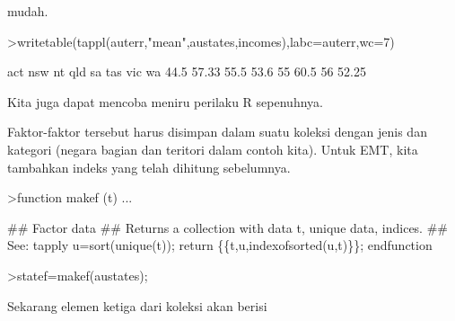 \documentclass[a4paper,10pt]{article}
\begin{document}
\begin{eulernotebook}
\begin{eulercomment}
\begin{eulercomment}
\begin{eulercomment}
\begin{eulercomment}
\begin{eulercomment}
\begin{eulercomment}
\begin{eulercomment}
\begin{eulercomment}
\begin{eulercomment}
\begin{eulercomment}
\begin{eulercomment}
\begin{eulercomment}
\begin{eulercomment}
\begin{eulercomment}
\begin{eulercomment}
\begin{eulercomment}
\begin{eulercomment}
\begin{eulercomment}
\begin{eulercomment}
\begin{eulercomment}
\begin{eulercomment}
\begin{eulercomment}
\begin{eulercomment}
\begin{eulercomment}
\begin{eulercomment}
\begin{eulercomment}
\begin{eulercomment}
\begin{eulercomment}
\begin{eulercomment}
\begin{eulercomment}
\begin{eulercomment}
\begin{eulercomment}
\begin{eulercomment}
\begin{eulercomment}
\begin{eulercomment}
\begin{eulercomment}
\begin{eulercomment}
\begin{eulercomment}
\begin{eulercomment}
\begin{eulercomment}
\begin{eulercomment}
\begin{eulercomment}
\begin{eulercomment}
\begin{eulercomment}
\begin{eulercomment}
\begin{eulercomment}
\begin{eulercomment}
\begin{eulercomment}
\begin{eulercomment}
\begin{eulercomment}
\begin{eulercomment}
\begin{eulercomment}
\begin{eulercomment}
\begin{eulercomment}
\begin{eulercomment}
\begin{eulercomment}
\begin{eulercomment}
\begin{eulercomment}
\begin{eulercomment}
\begin{eulercomment}
\begin{eulercomment}
\begin{eulercomment}
\begin{eulercomment}
\begin{eulercomment}
\begin{eulercomment}
\begin{eulercomment}
\begin{eulercomment}
\begin{eulercomment}
\begin{eulercomment}
mudah.
\end{eulercomment}
\begin{eulerprompt}
>writetable(tappl(auterr,"mean",austates,incomes),labc=auterr,wc=7)
\end{eulerprompt}
\begin{euleroutput}
      act    nsw     nt    qld     sa    tas    vic     wa
     44.5  57.33   55.5   53.6     55   60.5     56  52.25
\end{euleroutput}
\begin{eulercomment}
Kita juga dapat mencoba meniru perilaku R sepenuhnya.

Faktor-faktor tersebut harus disimpan dalam suatu koleksi dengan jenis
dan kategori (negara bagian dan teritori dalam contoh kita). Untuk
EMT, kita tambahkan indeks yang telah dihitung sebelumnya.
\end{eulercomment}
\begin{eulerprompt}
>function makef (t) ...
\end{eulerprompt}
\begin{eulerudf}
  ## Factor data
  ## Returns a collection with data t, unique data, indices.
  ## See: tapply
  u=sort(unique(t));
  return \{\{t,u,indexofsorted(u,t)\}\};
  endfunction
\end{eulerudf}
\begin{eulerprompt}
>statef=makef(austates);
\end{eulerprompt}
\begin{eulercomment}
Sekarang elemen ketiga dari koleksi akan berisi 
\end{eulercomment}
\end{eulercomment}
\end{eulercomment}
\end{eulercomment}
\end{eulercomment}
\end{eulercomment}
\end{eulercomment}
\end{eulercomment}
\end{eulercomment}
\end{eulercomment}
\end{eulercomment}
\end{eulercomment}
\end{eulercomment}
\end{eulercomment}
\end{eulercomment}
\end{eulercomment}
\end{eulercomment}
\end{eulercomment}
\end{eulercomment}
\end{eulercomment}
\end{eulercomment}
\end{eulercomment}
\end{eulercomment}
\end{eulercomment}
\end{eulercomment}
\end{eulercomment}
\end{eulercomment}
\end{eulercomment}
\end{eulercomment}
\end{eulercomment}
\end{eulercomment}
\end{eulercomment}
\end{eulercomment}
\end{eulercomment}
\end{eulercomment}
\end{eulercomment}
\end{eulercomment}
\end{eulercomment}
\end{eulercomment}
\end{eulercomment}
\end{eulercomment}
\end{eulercomment}
\end{eulercomment}
\end{eulercomment}
\end{eulercomment}
\end{eulercomment}
\end{eulercomment}
\end{eulercomment}
\end{eulercomment}
\end{eulercomment}
\end{eulercomment}
\end{eulercomment}
\end{eulercomment}
\end{eulercomment}
\end{eulercomment}
\end{eulercomment}
\end{eulercomment}
\end{eulercomment}
\end{eulercomment}
\end{eulercomment}
\end{eulercomment}
\end{eulercomment}
\end{eulercomment}
\end{eulercomment}
\end{eulercomment}
\end{eulercomment}
\end{eulercomment}
\end{eulercomment}
\end{eulercomment}
\end{eulernotebook}
\end{document}
